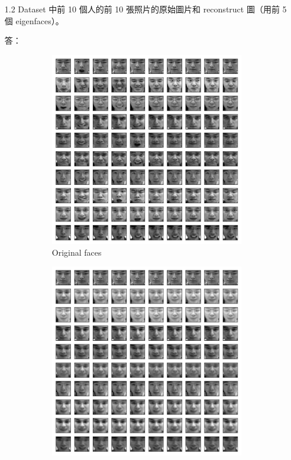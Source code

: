 \documentclass[12pt,a4paper]{extarticle}
\begin{document}
\begin{itemize}
  \item[1.2] Dataset 中前 10 個人的前 10 張照片的原始圖片和 reconstruct 圖（用前 5 個 eigenfaces）。
  \par 答：

  \begin{figure}[H]
    \begin{subfigure}[t]{0.5\textwidth}
      \centering
      \includegraphics[width=\linewidth]{origin-faces-first-100.png}
      \caption{Original faces}
      \label{fig:original-faces}
    \end{subfigure}
    \begin{subfigure}[t]{0.5\textwidth}
      \centering
      \includegraphics[width=\linewidth]{reconstruct-with-5-eigenfaces.png}

\end{subfigure}
\end{figure}
\end{itemize}
\end{document}
